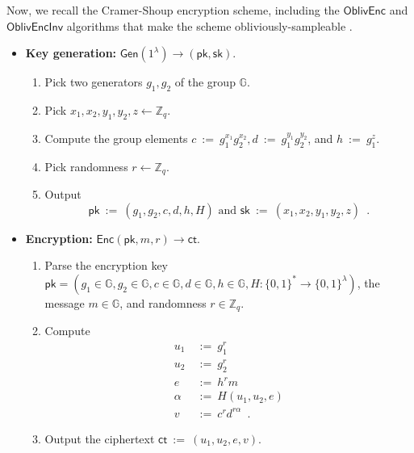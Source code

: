 \documentclass[11pt,letterpaper]{article}
\theoremstyle{plain} %
\theoremstyle{definition} %
\theoremstyle{remark} %
\newcommand{\eqdef}{\ {:=} \ }
\newcommand{\SecParam}{\lambda}
\newcommand{\Gen}{\mathsf{Gen}}
\newcommand{\Enc}{\mathsf{Enc}}
\newcommand{\OblivEnc}{\mathsf{OblivEnc}}
\newcommand{\OblivEncInv}{\mathsf{OblivEncInv}}
\newcommand{\EncKey}{\mathsf{pk}}
\newcommand{\DecKey}{\mathsf{sk}}
\newcommand{\Msg}{m}
\newcommand{\Ct}{\mathsf{ct}}
\newcommand{\Rand}{r}
\newcommand{\Bits}{\{0,1\}}
\newcommand{\Integers}{\mathbb{Z}}
\newcommand{\Group}{\mathbb{G}}
\newcommand{\GrpOrd}{q}
\newcommand{\GrpEltC}{c}
\newcommand{\GrpEltD}{d}
\newcommand{\GrpEltE}{e}
\newcommand{\GrpEltH}{h}
\newcommand{\GrpEltU}{u}
\newcommand{\GrpEltV}{v}
\newcommand{\Generator}{g}
\newcommand{\Hash}{H}
\newcommand{\ExpX}{x}
\newcommand{\ExpY}{y}
\newcommand{\ExpZ}{z}
\newcommand{\Tag}{\alpha}
\begin{document}
Now, we recall the Cramer-Shoup encryption scheme, including the $\OblivEnc$ and $\OblivEncInv$ algorithms that make the scheme obliviously-sampleable \cite{CanettiF01}.
\begin{itemize}[nolistsep]
    \item \textbf{Key generation:} $\Gen(1^{\SecParam}) \to (\EncKey, \DecKey)$.
    \begin{enumerate}[nolistsep]
        \item Pick two generators $\Generator_1, \Generator_2$ of the group $\Group$.
        \item Pick $\ExpX_1, \ExpX_2, \ExpY_1, \ExpY_2, \ExpZ \gets \Integers_{\GrpOrd}$.
        \item Compute the group elements $\GrpEltC \eqdef \Generator_1^{\ExpX_1}\Generator_2^{\ExpX_2}, \GrpEltD \eqdef \Generator_1^{\ExpY_1}\Generator_2^{\ExpY_2}$, and $\GrpEltH \eqdef \Generator_1^{\ExpZ}$.
        \item Pick randomness $\Rand \gets \Integers_{\GrpOrd}$.
        \item Output
        \begin{equation*}
            \EncKey \eqdef (\Generator_1, \Generator_2, \GrpEltC, \GrpEltD, \GrpEltH, \Hash)
            \textrm{ and }
            \DecKey \eqdef (\ExpX_1, \ExpX_2, \ExpY_1, \ExpY_2, \ExpZ)
            \enspace.
        \end{equation*}
    \end{enumerate}

    \item \textbf{Encryption:} $\Enc(\EncKey, \Msg, \Rand) \to \Ct$.
    \begin{enumerate}[nolistsep]
        \item Parse the encryption key $\EncKey = (\Generator_1 \in \Group, \Generator_2 \in \Group, \GrpEltC\in \Group, \GrpEltD\in \Group, \GrpEltH\in \Group, \Hash \colon \Bits^{*} \to \Bits^{\SecParam})$, the message $\Msg \in \Group$, and randomness $\Rand \in \Integers_{\GrpOrd}$.
        \item Compute
        \begin{align*}
            \GrpEltU_1 &\eqdef \Generator_1^{\Rand}\\
            \GrpEltU_2 &\eqdef \Generator_2^{\Rand}\\
            \GrpEltE &\eqdef \GrpEltH^{\Rand}\Msg\\
            \Tag &\eqdef \Hash(\GrpEltU_1, \GrpEltU_2, \GrpEltE)\\
            \GrpEltV &\eqdef \GrpEltC^{\Rand}\GrpEltD^{\Rand\Tag}
            \enspace.
        \end{align*}
        \item Output the ciphertext $\Ct \eqdef (\GrpEltU_1, \GrpEltU_2, \GrpEltE, \GrpEltV)$.
    \end{enumerate}


\end{itemize}
\end{document}
